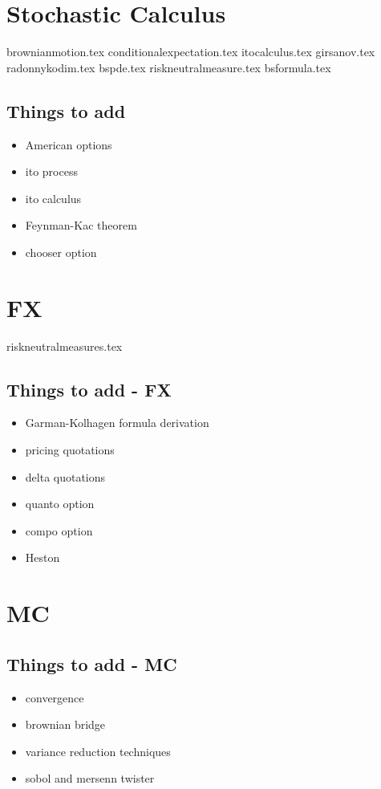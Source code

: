 \documentclass{report}
\begin{document}
\tableofcontents
	
\part{Stochastic Calculus}

{brownianmotion.tex}
{conditionalexpectation.tex}
{itocalculus.tex}
{girsanov.tex}
{radonnykodim.tex}
{bspde.tex}
{riskneutralmeasure.tex}
{bsformula.tex}


\chapter{Things to add}
\begin{itemize}
	\item American options
	\item ito process
	\item ito calculus
	\item Feynman-Kac theorem
	\item chooser option
\end{itemize}


\part{FX}

{riskneutralmeasures.tex}

\chapter{Things to add - FX}
\begin{itemize}
	\item Garman-Kolhagen formula derivation
	\item pricing quotations
	\item delta quotations
	\item quanto option
	\item compo option
	\item Heston
\end{itemize}


\part{MC}

\chapter{Things to add - MC}
\begin{itemize}
	\item convergence
	\item brownian bridge
	\item variance reduction techniques
	\item sobol and mersenn twister
\end{itemize}
\end{document}
